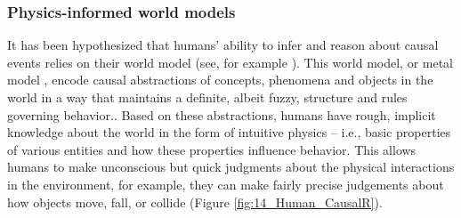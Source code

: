 \documentclass[10pt,journal,compsoc]{IEEEtran}
\begin{document}
	\subsubsection{Physics-informed world models}
	It has been hypothesized that humans’ ability to infer and reason about causal events relies on their world model (see, for example \cite{goldvarg2001naive,hafri2021perception,baradel2019cophy}).  This world model, or metal model \cite{jones2011mental}, encode causal abstractions of concepts, phenomena and objects in the world in a way that maintains a definite, albeit fuzzy, structure and rules governing behavior.. Based on these abstractions, humans have rough, implicit knowledge about the world in the form of intuitive physics \cite{kubricht2017intuitive}– i.e., basic properties of various entities and how these properties influence behavior. This allows humans to make unconscious but quick judgments about the physical interactions in the environment, for example, they can make fairly precise judgements about how objects move, fall, or collide (Figure \ref{fig:14_Human_CausalR}).
	
	
	
\end{document}
